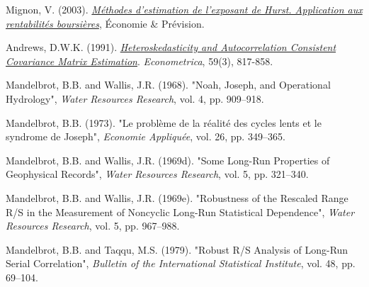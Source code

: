 \documentclass[11pt]{extarticle}
\begin{document}
Mignon, V. (2003). \textit{\href{https://www.persee.fr/doc/ecop_0249-4744_1998_num_132_1_5909}{Méthodes d'estimation de l'exposant de Hurst. Application aux rentabilités boursières}}, Économie \& Prévision.

Andrews, D.W.K. (1991). \textit{\href{https://www.jstor.org/stable/2938229}{Heteroskedasticity and Autocorrelation Consistent Covariance Matrix Estimation}}. \textit{Econometrica}, 59(3), 817-858.

Mandelbrot, B.B. and Wallis, J.R. (1968). "Noah, Joseph, and Operational Hydrology", \textit{Water Resources Research}, vol. 4, pp. 909--918.

Mandelbrot, B.B. (1973). "Le problème de la réalité des cycles lents et le syndrome de Joseph", \textit{Economie Appliquée}, vol. 26, pp. 349--365.

Mandelbrot, B.B. and Wallis, J.R. (1969d). "Some Long-Run Properties of Geophysical Records", \textit{Water Resources Research}, vol. 5, pp. 321--340.

Mandelbrot, B.B. and Wallis, J.R. (1969e). "Robustness of the Rescaled Range R/S in the Measurement of Noncyclic Long-Run Statistical Dependence", \textit{Water Resources Research}, vol. 5, pp. 967--988.

Mandelbrot, B.B. and Taqqu, M.S. (1979). "Robust R/S Analysis of Long-Run Serial Correlation", \textit{Bulletin of the International Statistical Institute}, vol. 48, pp. 69--104.
\end{document}
